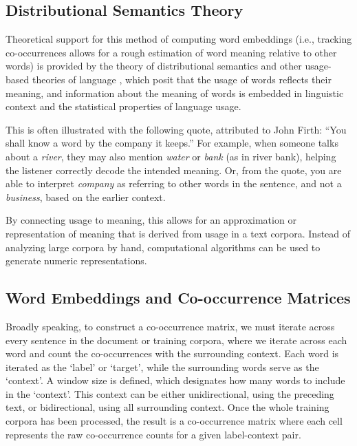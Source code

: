  
\subsection{Distributional Semantics Theory}

Theoretical support for this method of computing word embeddings (i.e., tracking co-occurrences allows for a rough estimation of word meaning relative to other words) is provided by the theory of distributional semantics \cite{harris1954distributional, firth1957synopsis} and other usage-based theories of language \cite{wittgenstein1953philosophical}, which posit that the usage of words reflects their meaning, and information about the meaning of words is embedded in linguistic context and the statistical properties of language usage.

This is often illustrated with the following quote, attributed to John Firth: ``You shall know a word by the company it keeps.'' For example, when someone talks about a \textit{river}, they may also mention \textit{water} or \textit{bank} (as in river bank), helping the listener correctly decode the intended meaning. Or, from the quote, you are able to interpret \textit{company} as referring to other words in the sentence, and not a \textit{business}, based on the earlier context.

By connecting usage to meaning, this allows for an approximation or representation of meaning that is derived from usage in a text corpora. Instead of analyzing large corpora by hand, computational algorithms can be used to generate numeric representations.

\subsection{Word Embeddings and Co-occurrence Matrices}


Broadly speaking, to construct a co-occurrence matrix, we must iterate across every sentence in the document or training corpora, where we iterate across each word and count the co-occurrences with the surrounding context. Each word is iterated as the `label' or `target', while the surrounding words serve as the `context'. A window size is defined, which designates how many words to include in the `context'. This context can be either unidirectional, using the preceding text, or bidirectional, using all surrounding context. Once the whole training corpora has been processed, the result is a co-occurrence matrix where each cell represents the raw co-occurrence counts for a given label-context pair.

